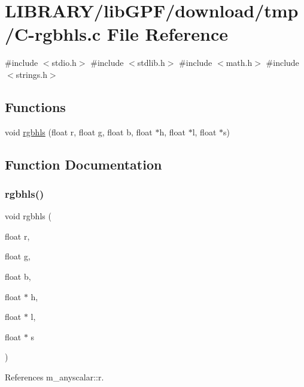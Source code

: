 \hypertarget{C-rgbhls_8c}{}\section{L\+I\+B\+R\+A\+R\+Y/lib\+G\+P\+F/download/tmp/\+C-\/rgbhls.c File Reference}
\label{C-rgbhls_8c}
{\ttfamily \#include $<$stdio.\+h$>$}\newline
{\ttfamily \#include $<$stdlib.\+h$>$}\newline
{\ttfamily \#include $<$math.\+h$>$}\newline
{\ttfamily \#include $<$strings.\+h$>$}\newline
\subsection*{Functions}
\begin{DoxyCompactItemize}
\item 
void \hyperlink{C-rgbhls_8c_abf59942f8e2e56ebf4efafcef62b2813}{rgbhls} (float r, float g, float b, float $\ast$h, float $\ast$l, float $\ast$s)
\end{DoxyCompactItemize}


\subsection{Function Documentation}
\mbox{\label{C-rgbhls_8c_abf59942f8e2e56ebf4efafcef62b2813}} 
\subsubsection{\texorpdfstring{rgbhls()}{rgbhls()}}
{\footnotesize\ttfamily void rgbhls (\begin{DoxyParamCaption}\item[{float}]{r,  }\item[{float}]{g,  }\item[{float}]{b,  }\item[{float $\ast$}]{h,  }\item[{float $\ast$}]{l,  }\item[{float $\ast$}]{s }\end{DoxyParamCaption})}



References m\+\_\+anyscalar\+::r.

